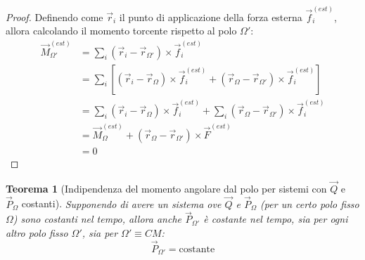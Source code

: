 \documentclass[11pt, a4paper, openright]{book}
\theoremstyle{plain}
\newtheorem{theorem}{Teorema}[section]
\theoremstyle{definition}
\begin{document}
\begin{proof}
    Definendo come $\vec{r}_i$ il punto di applicazione della forza esterna $\vec{f}_i^{(est)}$, allora calcolando il momento torcente rispetto al polo $\Omega'$:
    \begin{align}
        \vec{M}_{\Omega'}^{(est)} & = \sum_i (\vec{r}_i - \vec{r}_{\Omega'}) \times \vec{f}_i^{(est)} \\
        & = \sum_i \left[(\vec{r}_i - \vec{r}_\Omega) \times \vec{f}_i^{(est)} + (\vec{r}_\Omega - \vec{r}_{\Omega'}) \times \vec{f}_i^{(est)}\right] \\
        & = \sum_i (\vec{r}_i - \vec{r}_\Omega) \times \vec{f}_i^{(est)} + \sum_i (\vec{r}_\Omega - \vec{r}_{\Omega'}) \times \vec{f}_i^{(est)} \\
        & = \vec{M}_\Omega^{(est)} + (\vec{r}_\Omega - \vec{r}_{\Omega'}) \times \vec{F}^{(est)} \\
        & = 0
    \end{align}
\end{proof}

\begin{theorem}[Indipendenza del momento angolare dal polo per sistemi con $\vec{Q}$ e $\vec{P}_\Omega$ costanti]
    Supponendo di avere un sistema ove $\vec{Q}$ e $\vec{P}_\Omega$ (per un certo polo fisso $\Omega$) sono costanti nel tempo, allora anche $\vec{P}_{\Omega'}$ è costante nel tempo, sia per ogni altro polo fisso $\Omega'$, sia per $\Omega' \equiv CM$:
\begin{equation}
    \vec{P}_{\Omega'} = \text{costante}
\end{equation}
\end{theorem}
\end{document}
